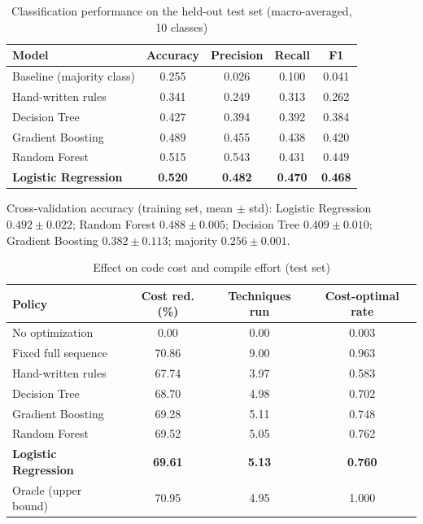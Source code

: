 \documentclass[12pt,a4paper]{article}
\begin{document}
\begin{table}[H]
\centering
\caption{Classification performance on the held-out test set (macro-averaged, 10 classes)}
\label{tab:cls}
\begin{tabular}{lcccc}
\toprule
\textbf{Model} & \textbf{Accuracy} & \textbf{Precision} & \textbf{Recall} & \textbf{F1}\\
\midrule
Baseline (majority class) & 0.255 & 0.026 & 0.100 & 0.041\\
Hand-written rules & 0.341 & 0.249 & 0.313 & 0.262\\
Decision Tree & 0.427 & 0.394 & 0.392 & 0.384\\
Gradient Boosting & 0.489 & 0.455 & 0.438 & 0.420\\
Random Forest & 0.515 & 0.543 & 0.431 & 0.449\\
\textbf{Logistic Regression} & \textbf{0.520} & \textbf{0.482} & \textbf{0.470} & \textbf{0.468}\\
\bottomrule
\end{tabular}
\end{table}

\noindent Cross-validation accuracy (training set, mean $\pm$ std): Logistic
Regression $0.492 \pm 0.022$; Random Forest $0.488 \pm 0.005$; Decision Tree
$0.409 \pm 0.010$; Gradient Boosting $0.382 \pm 0.113$; majority
$0.256 \pm 0.001$.

\begin{table}[H]
\centering
\caption{Effect on code cost and compile effort (test set)}
\label{tab:cost}
\begin{tabular}{lccc}
\toprule
\textbf{Policy} & \textbf{Cost red. (\%)} & \textbf{Techniques run} & \textbf{Cost-optimal rate}\\
\midrule
No optimization & 0.00 & 0.00 & 0.003\\
Fixed full sequence & 70.86 & 9.00 & 0.963\\
Hand-written rules & 67.74 & 3.97 & 0.583\\
Decision Tree & 68.70 & 4.98 & 0.702\\
Gradient Boosting & 69.28 & 5.11 & 0.748\\
Random Forest & 69.52 & 5.05 & 0.762\\
\textbf{Logistic Regression} & \textbf{69.61} & \textbf{5.13} & \textbf{0.760}\\
Oracle (upper bound) & 70.95 & 4.95 & 1.000\\
\bottomrule
\end{tabular}
\end{table}
\end{document}
